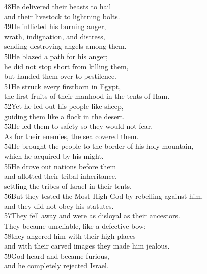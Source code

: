 \begin{poetry}
\poeml \v{48}He delivered their beasts to hail \\
\poemll    and their livestock to lightning bolts. \\
\poeml \v{49}He inflicted his burning anger, \\
\poemll    wrath, indignation, and distress, \\
\poemlll       sending destroying angels among them. \\
\poeml \v{50}He blazed a path for his anger; \\
\poemll    he did not stop short from killing them, \\
\poemlll       but handed them over to pestilence. \\
\poeml \v{51}He struck every firstborn in Egypt, \\
\poemll    the first fruits of their manhood in the tents of Ham. \\
\poeml \v{52}Yet he led out his people like sheep, \\
\poemll    guiding them like a flock in the desert. \\
\poeml \v{53}He led them to safety so they would not fear. \\
\poemll    As for their enemies, the sea covered them. \\
\poeml \v{54}He brought the people to the border of his holy mountain, \\
\poemll    which he acquired by his might. \\
\poeml \v{55}He drove out nations before them \\
\poemll    and allotted their tribal inheritance, \\
\poemlll       settling the tribes of Israel in their tents. \\
\poeml \v{56}But they tested the Most High God by rebelling against him, \\
\poemll    and they did not obey his statutes. \\
\poeml \v{57}They fell away and were as disloyal as their ancestors. \\
\poemll    They became unreliable, like a defective bow; \\
\poeml \v{58}they angered him with their high places \\
\poemll    and with their carved images they made him jealous. \\
\poeml \v{59}God heard and became furious, \\
\poemll    and he completely rejected Israel. \\

\end{poetry}
